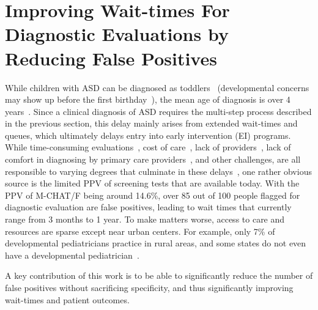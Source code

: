 \documentclass[onecolumn,,10pt]{IEEEtran}
\begin{document}
\section{Improving Wait-times For  Diagnostic Evaluations by Reducing False Positives}\label{sec:waittime}
While children with ASD  can be diagnosed as toddlers~\cite{lord2006autism,kleinman2008diagnostic} (developmental concerns may show up before the first birthday~\cite{bolton2012autism,kozlowski2011parents}), the mean  age of
diagnosis is over 4 years~\cite{baio2014prevalence}. 
%
%
Since a clinical diagnosis of ASD requires the multi-step process described in the previous section, this delay mainly arises from extended   wait-times and queues, which ultimately 
delays entry into early intervention (EI) programs. 
While   time-consuming evaluations~\cite{kalb2012determinants}, cost of care~\cite{bisgaier2011access},  lack of providers~\cite{fenikile2015barriers}, lack of comfort in diagnosing
by primary care providers~\cite{fenikile2015barriers},  and other challenges, are all responsible to varying degrees that culminate in these delays~\cite{gordon2016whittling}, one rather obvious source is the limited PPV of screening tests that are available today. With the PPV of M-CHAT/F being around 14.6\%, over 85 out of 100 people flagged for diagnostic evaluation are false positives, leading to wait times that currently range from 3 months to 1 year. To make matters worse, access to care and resources are sparse  except near urban  centers. For example, only 7\% of developmental pediatricians practice in rural areas, and some states do not even have a developmental pediatrician~\cite{gordon2016whittling,althouse2006pediatric}.

A key contribution of this work is to be able to significantly reduce the number of false positives without sacrificing specificity, and thus significantly  improving wait-times and  patient outcomes.
  
\end{document}
